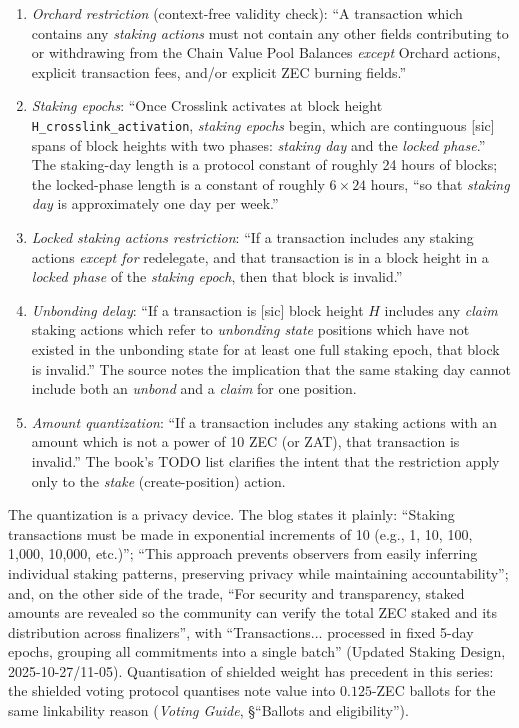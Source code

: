 \documentclass[11pt,a4paper]{article}
\theoremstyle{definition}
\begin{document}
\begin{enumerate}
\item \emph{Orchard restriction} (context-free validity check): ``A
  transaction which contains any \emph{staking actions} must not contain
  any other fields contributing to or withdrawing from the Chain Value
  Pool Balances \emph{except} Orchard actions, explicit transaction fees,
  and/or explicit ZEC burning fields.''
\item \emph{Staking epochs}: ``Once Crosslink activates at block height
  \texttt{H\_crosslink\_activation}, \emph{staking epochs} begin, which
  are continguous [sic] spans of block heights with two phases:
  \emph{staking day} and the \emph{locked phase}.'' The staking-day length
  is a protocol constant of roughly 24 hours of blocks; the locked-phase
  length is a constant of roughly $6 \times 24$ hours, ``so that
  \emph{staking day} is approximately one day per week.''
\item \emph{Locked staking actions restriction}: ``If a transaction
  includes any staking actions \emph{except for} redelegate, and that
  transaction is in a block height in a \emph{locked phase} of the
  \emph{staking epoch}, then that block is invalid.''
\item \emph{Unbonding delay}: ``If a transaction is [sic] block height
  $H$ includes any \emph{claim} staking actions which refer to
  \emph{unbonding state} positions which have not existed in the unbonding
  state for at least one full staking epoch, that block is invalid.'' The
  source notes the implication that the same staking day cannot include
  both an \emph{unbond} and a \emph{claim} for one position.
\item \emph{Amount quantization}: ``If a transaction includes any staking
  actions with an amount which is not a power of 10 ZEC (or ZAT), that
  transaction is invalid.'' The book's TODO list clarifies the intent that
  the restriction apply only to the \emph{stake} (create-position) action.
\end{enumerate}

The quantization is a privacy device. The blog states it plainly:
``Staking transactions must be made in exponential increments of 10
(e.g., 1, 10, 100, 1,000, 10,000, etc.)''; ``This approach prevents
observers from easily inferring individual staking patterns, preserving
privacy while maintaining accountability''; and, on the other side of the
trade, ``For security and transparency, staked amounts are revealed so
the community can verify the total ZEC staked and its distribution across
finalizers'', with ``Transactions... processed in fixed 5-day epochs,
grouping all commitments into a single batch'' (Updated Staking Design,
2025-10-27/11-05). Quantisation of shielded weight has precedent in this
series: the shielded voting protocol quantises note value into
$0.125$-ZEC ballots for the same linkability reason (\emph{Voting Guide},
\S``Ballots and eligibility'').
\end{document}
